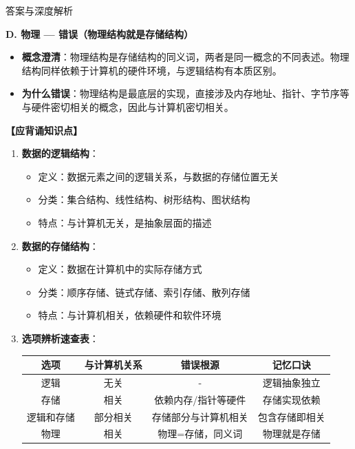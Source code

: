 \documentclass[12pt, a4paper]{article}
\newenvironment{bluebox}{\begin{framed}\begin{minipage}{\textwidth}}{\end{minipage}\end{framed}}
\begin{document}
\begin{bluebox}{答案与深度解析}
	\item \textbf{D. 物理 — 错误（物理结构就是存储结构）}
	\begin{itemize}
		\item \textbf{概念澄清}：物理结构是存储结构的同义词，两者是同一概念的不同表述。物理结构同样依赖于计算机的硬件环境，与逻辑结构有本质区别。
		\item \textbf{为什么错误}：物理结构是最底层的实现，直接涉及内存地址、指针、字节序等与硬件密切相关的概念，因此与计算机密切相关。
	\end{itemize}

	\textbf{【应背诵知识点】}

	\begin{enumerate}
		\item \textbf{数据的逻辑结构}：
		      \begin{itemize}
			      \item 定义：数据元素之间的逻辑关系，与数据的存储位置无关
			      \item 分类：集合结构、线性结构、树形结构、图状结构
			      \item 特点：与计算机无关，是抽象层面的描述
		      \end{itemize}

		\item \textbf{数据的存储结构}：
		      \begin{itemize}
			      \item 定义：数据在计算机中的实际存储方式
			      \item 分类：顺序存储、链式存储、索引存储、散列存储
			      \item 特点：与计算机相关，依赖硬件和软件环境
		      \end{itemize}

		\item \textbf{选项辨析速查表}：
		      \begin{tabular}{|c|c|c|c|}
			      \hline
			      \textbf{选项} & \textbf{与计算机关系} & \textbf{错误根源} & \textbf{记忆口诀} \\
			      \hline
			      逻辑          & 无关              & -             & 逻辑抽象独立        \\
			      \hline
			      存储          & 相关              & 依赖内存/指针等硬件    & 存储实现依赖        \\
			      \hline
			      逻辑和存储       & 部分相关            & 存储部分与计算机相关    & 包含存储即相关       \\
			      \hline
			      物理          & 相关              & 物理=存储，同义词     & 物理就是存储        \\
			      \hline
		      \end{tabular}


\end{enumerate}
\end{bluebox}
\end{document}
